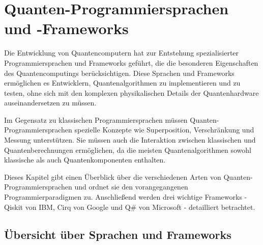 \section{Quanten-Programmiersprachen und -Frameworks}


Die Entwicklung von Quantencomputern hat zur Entstehung spezialisierter Programmiersprachen und Frameworks geführt, die die besonderen Eigenschaften des Quantencomputings berücksichtigen. Diese Sprachen und Frameworks ermöglichen es Entwicklern, Quantenalgorithmen zu implementieren und zu testen, ohne sich mit den komplexen physikalischen Details der Quantenhardware auseinandersetzen zu müssen.

Im Gegensatz zu klassischen Programmiersprachen müssen Quanten-Programmiersprachen spezielle Konzepte wie Superposition, Verschränkung und Messung unterstützen. Sie müssen auch die Interaktion zwischen klassischen und Quantenberechnungen ermöglichen, da die meisten Quantenalgorithmen sowohl klassische als auch Quantenkomponenten enthalten.

Dieses Kapitel gibt einen Überblick über die verschiedenen Arten von Quanten-Programmiersprachen und ordnet sie den vorangegangenen Programmierparadigmen zu. Anschließend werden drei wichtige Frameworks - Qiskit von IBM, Cirq von Google und Q\# von Microsoft - detailliert betrachtet.

\subsection{Übersicht über Sprachen und Frameworks}


